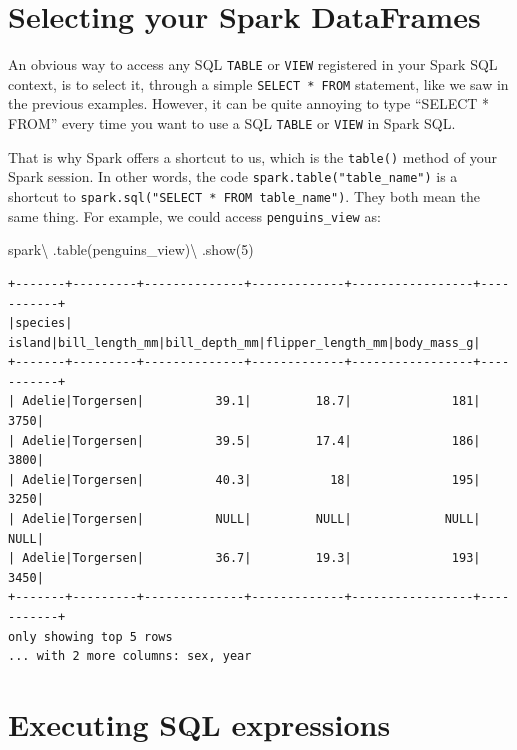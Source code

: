 \documentclass[
  11pt,
  letterpaper,
  DIV=11,
  numbers=noendperiod]{scrreprt}
\newenvironment{Shaded}{\begin{snugshade}}{\end{snugshade}}
\newcommand{\DecValTok}[1]{\textcolor[rgb]{0.68,0.00,0.00}{#1}}
\newcommand{\NormalTok}[1]{\textcolor[rgb]{0.00,0.23,0.31}{#1}}
\newcommand{\OperatorTok}[1]{\textcolor[rgb]{0.37,0.37,0.37}{#1}}
\newcommand{\StringTok}[1]{\textcolor[rgb]{0.13,0.47,0.30}{#1}}
\begin{document}
\hypertarget{selecting-your-spark-dataframes}{%
\section{Selecting your Spark
DataFrames}\label{selecting-your-spark-dataframes}}

An obvious way to access any SQL \texttt{TABLE} or \texttt{VIEW}
registered in your Spark SQL context, is to select it, through a simple
\texttt{SELECT\ *\ FROM} statement, like we saw in the previous
examples. However, it can be quite annoying to type ``SELECT * FROM''
every time you want to use a SQL \texttt{TABLE} or \texttt{VIEW} in
Spark SQL.

That is why Spark offers a shortcut to us, which is the \texttt{table()}
method of your Spark session. In other words, the code
\texttt{spark.table("table\_name")} is a shortcut to
\texttt{spark.sql("SELECT\ *\ FROM\ table\_name")}. They both mean the
same thing. For example, we could access \texttt{penguins\_view} as:

\begin{Shaded}
\begin{Highlighting}[]
\NormalTok{spark}\OperatorTok{\textbackslash{}}
\NormalTok{  .table(}\StringTok{\textquotesingle{}penguins\_view\textquotesingle{}}\NormalTok{)}\OperatorTok{\textbackslash{}}
\NormalTok{  .show(}\DecValTok{5}\NormalTok{)}
\end{Highlighting}
\end{Shaded}

\begin{verbatim}
+-------+---------+--------------+-------------+-----------------+-----------+
|species|   island|bill_length_mm|bill_depth_mm|flipper_length_mm|body_mass_g|
+-------+---------+--------------+-------------+-----------------+-----------+
| Adelie|Torgersen|          39.1|         18.7|              181|       3750|
| Adelie|Torgersen|          39.5|         17.4|              186|       3800|
| Adelie|Torgersen|          40.3|           18|              195|       3250|
| Adelie|Torgersen|          NULL|         NULL|             NULL|       NULL|
| Adelie|Torgersen|          36.7|         19.3|              193|       3450|
+-------+---------+--------------+-------------+-----------------+-----------+
only showing top 5 rows
... with 2 more columns: sex, year
\end{verbatim}

\hypertarget{executing-sql-expressions}{%
\section{Executing SQL expressions}\label{executing-sql-expressions}}
\end{document}
